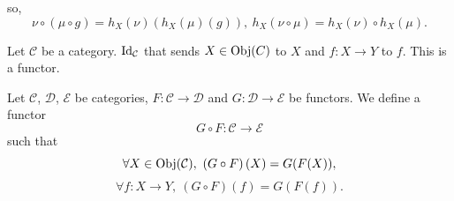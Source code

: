 \begin{exampleenv}
\begin{center}
\end{center}
so,
$$\nu\circ\left(\mu\circ g\right) = h_X(\nu)\left(h_X(\mu)(g)\right),\ h_X(\nu\circ\mu) = h_X(\nu)\circ h_X(\mu).$$
\end{exampleenv}
\begin{exampleenv}
    Let $\mathcal{C}$ be a category. $\operatorname{\mathrm{Id}}_\mathcal{C}$ that sends $X\in \operatorname{\mathrm{Obj}}(C)$ to $X$ and $f:X\rightarrow Y$ to $f$. This is a functor.
\end{exampleenv}
\begin{exampleenv}
    Let $\mathcal{C}$, $\mathcal{D}$, $\mathcal{E}$ be categories, $F:\mathcal{C}\rightarrow\mathcal{D}$ and $G:\mathcal{D}\rightarrow\mathcal{E}$ be functors. We define a functor
    $$G\circ F:\mathcal{C}\rightarrow \mathcal{E}$$
    such that 
    $$\forall X\in \Obj(\mathcal{C}),\ \left(G\circ F\right)(X)=G(F(X)),$$
    $$\forall f:X\rightarrow Y,\ \left(G\circ F\right)(f) = G(F(f)).$$
\end{exampleenv}
